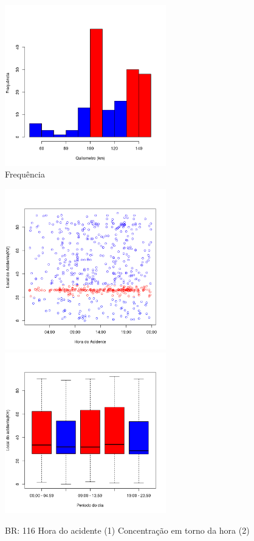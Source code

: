 \quad \quad
\begin{figure}[h]
	\centering
	\caption{ Frequência}
	\includegraphics[width=7cm,height=7cm]{Figuras/Preprocess/br110_3.png}
\end{figure}

\pagebreak

\begin{figure}[h]
	\caption{BR: 116 Hora do acidente (1) Concentração em torno da hora (2)}
	\includegraphics[width=7cm,height=7cm]{Figuras/Preprocess/br116_1.png}
	\includegraphics[width=7cm,height=7cm]{Figuras/Preprocess/br116_2.png}

\end{figure}

